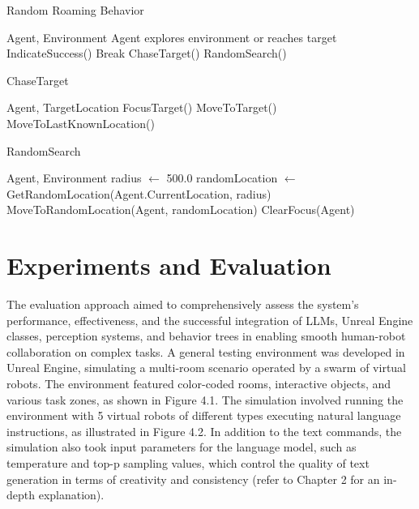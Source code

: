 \documentclass[pdflatex,sn-mathphys-num]{sn-jnl}%
\theoremstyle{thmstyleone}%
\theoremstyle{thmstyletwo}%
\theoremstyle{thmstylethree}%
\begin{document}
\begin{algorithm}
\caption{Random Roaming Behavior}\label{algo:random_roaming}
\begin{algorithmic}[1]
\Require Agent, Environment
\Ensure Agent explores environment or reaches target
\State IndicateSuccess()
\State Break
\EndIf
{}
\State ChaseTarget()
\Else
\State RandomSearch()
\EndIf
\EndWhile
\end{algorithmic}
\end{algorithm}
\begin{algorithm}
\caption{ChaseTarget}\label{algo:chase_target}
\begin{algorithmic}[1]
\Require Agent, TargetLocation
\State FocusTarget()
\State MoveToTarget()
\Else
\State MoveToLastKnownLocation()
\EndIf
\end{algorithmic}
\end{algorithm}
\begin{algorithm}
\caption{RandomSearch}\label{algo:random_search}
\begin{algorithmic}[1]
\Require Agent, Environment
\State radius $\leftarrow$ 500.0
\State randomLocation $\leftarrow$ GetRandomLocation(Agent.CurrentLocation, radius)
\State MoveToRandomLocation(Agent, randomLocation)
\State ClearFocus(Agent)
\end{algorithmic}
\end{algorithm}



\section{Experiments and Evaluation}
The evaluation approach aimed to comprehensively assess the system's performance, effectiveness, and the successful integration of LLMs, Unreal Engine classes, perception systems, and behavior trees in enabling smooth human-robot collaboration on complex tasks. A general testing environment was developed in Unreal Engine, simulating a multi-room scenario operated by a swarm of virtual robots. The environment featured color-coded rooms, interactive objects, and various task zones, as shown in Figure 4.1.
The simulation involved running the environment with 5 virtual robots of different types executing natural language instructions, as illustrated in Figure 4.2. In addition to the text commands, the simulation also took input parameters for the language model, such as temperature and top-p sampling values, which control the quality of text generation in terms of creativity and consistency (refer to Chapter 2 for an in-depth explanation).
\end{document}
